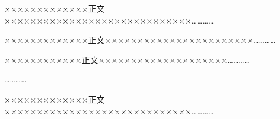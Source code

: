 \documentclass[a4paper,zihao=-4]{ctexart}
\newlength{\samplecontentwidth}
\newlength{\samplexoffset}
\newcommand{\samplebodytext}[1]{%
    {\songti\zihao{-4}\noindent #1\par}%
}
\begin{document}
\setcounter{page}{42}
\thispagestyle{fancy}

\vspace*{0.03cm}
\noindent\hspace*{\samplexoffset}\begin{minipage}[t]{\samplecontentwidth}
\vspace{0.16cm}
\samplebodytext{\hspace*{2em}×××××××××××××正文×××××××××××××××××××××××××××××…………}
\vspace{0.16cm}

\vspace{0.10cm}
\samplebodytext{\hspace*{2em}×××××××××××××正文×××××××××××××××××××××××…………}
\vspace{0.10cm}

\vspace{0.10cm}
\samplebodytext{\hspace*{2em}××××××××××××正文××××××××××××××××××××…………}
\vspace{0.06cm}
\samplebodytext{\hspace*{2em}…………}
\vspace{1.08cm}

\vspace{0.18cm}
\samplebodytext{\hspace*{2em}×××××××××××××正文×××××××××××××××××××××××××××××…………}
\vspace{0.42cm}


\end{minipage}
\end{document}
